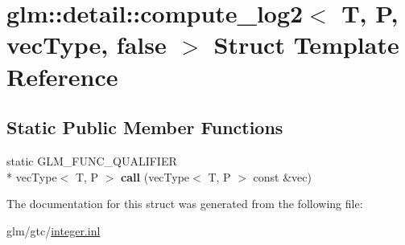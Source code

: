 \hypertarget{structglm_1_1detail_1_1compute__log2_3_01T_00_01P_00_01vecType_00_01false_01_4}{\section{glm\-:\-:detail\-:\-:compute\-\_\-log2$<$ T, P, vec\-Type, false $>$ Struct Template Reference}
\label{structglm_1_1detail_1_1compute__log2_3_01T_00_01P_00_01vecType_00_01false_01_4}
}
\subsection*{Static Public Member Functions}
\begin{DoxyCompactItemize}
\item 
\hypertarget{structglm_1_1detail_1_1compute__log2_3_01T_00_01P_00_01vecType_00_01false_01_4_ad2408ae0974d10cf652be563bcc29789}{static G\-L\-M\-\_\-\-F\-U\-N\-C\-\_\-\-Q\-U\-A\-L\-I\-F\-I\-E\-R \\*
vec\-Type$<$ T, P $>$ {\bfseries call} (vec\-Type$<$ T, P $>$ const \&vec)}\label{structglm_1_1detail_1_1compute__log2_3_01T_00_01P_00_01vecType_00_01false_01_4_ad2408ae0974d10cf652be563bcc29789}

\end{DoxyCompactItemize}


The documentation for this struct was generated from the following file\-:\begin{DoxyCompactItemize}
\item 
glm/gtc/\hyperlink{gtc_2integer_8inl}{integer.\-inl}\end{DoxyCompactItemize}
